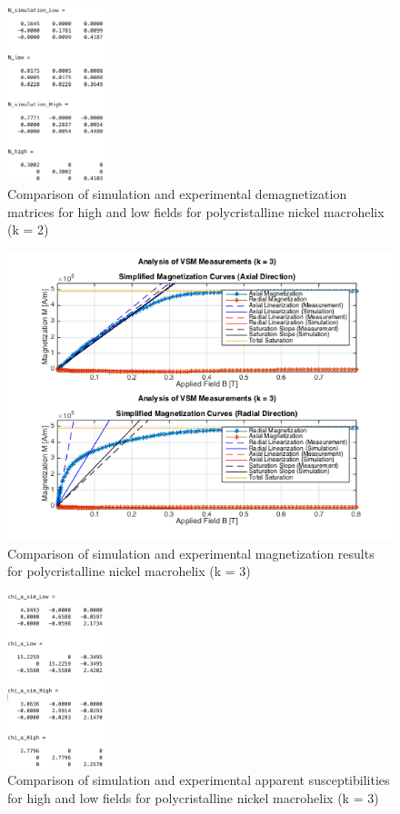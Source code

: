 \begin{figure}[h]
	\centering
  \includegraphics[width=0.25\textwidth]{Pictures/ExperimentalAssessk2N.png}
	\caption{Comparison of simulation and experimental demagnetization matrices for high and low fields for polycristalline nickel macrohelix (k = 2)}
	\label{fig:ExperimentalAssessk2N}
\end{figure}


\begin{figure}[h]
	\centering
  \includegraphics[width=1\textwidth]{Pictures/ExperimentalAssessk3.png}
	\caption{Comparison of simulation and experimental magnetization results for polycristalline nickel macrohelix (k = 3)}
	\label{fig:ExperimentalAssessk3}
\end{figure}

\begin{figure}[h]
	\centering
  \includegraphics[width=0.25\textwidth]{Pictures/ExperimentalAssessk3chi.png}
	\caption{Comparison of simulation and experimental apparent susceptibilities for high and low fields for polycristalline nickel macrohelix (k = 3)}
	\label{fig:ExperimentalAssessk3chi}
\end{figure}

